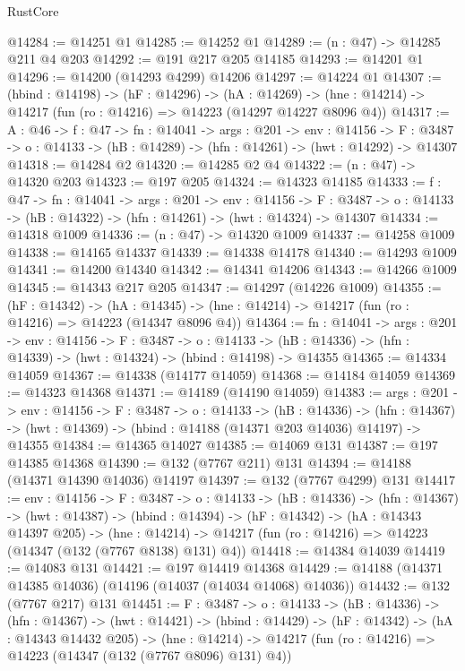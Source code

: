 \begin{lexlean}{RustCore}
\begin{coremodule}
@14284 := @14251 @1
@14285 := @14252 @1
@14289 := (n : @47) -> @14285 @211 @4 @203
@14292 := @191 @217 @205 @14185
@14293 := @14201 @1
@14296 := @14200 (@14293 @4299) @14206
@14297 := @14224 @1
@14307 := (hbind : @14198) ->
  (hF : @14296) ->
  (hA : @14269) -> (hne : @14214) -> @14217 (fun (ro : @14216) => @14223 (@14297 @14227 @8096 @4))
@14317 := {A : @46} ->
  {f : @47} ->
  {fn : @14041} ->
  {args : @201} ->
  {env : @14156} ->
  {F : @3487} -> {o : @14133} -> (hB : @14289) -> (hfn : @14261) -> (hwt : @14292) -> @14307
@14318 := @14284 @2
@14320 := @14285 @2 @4
@14322 := (n : @47) -> @14320 @203
@14323 := @197 @205
@14324 := @14323 @14185
@14333 := {f : @47} ->
  {fn : @14041} ->
  {args : @201} ->
  {env : @14156} ->
  {F : @3487} -> {o : @14133} -> (hB : @14322) -> (hfn : @14261) -> (hwt : @14324) -> @14307
@14334 := @14318 @1009
@14336 := (n : @47) -> @14320 @1009
@14337 := @14258 @1009
@14338 := @14165 @14337
@14339 := @14338 @14178
@14340 := @14293 @1009
@14341 := @14200 @14340
@14342 := @14341 @14206
@14343 := @14266 @1009
@14345 := @14343 @217 @205
@14347 := @14297 (@14226 @1009)
@14355 := (hF : @14342) ->
  (hA : @14345) -> (hne : @14214) -> @14217 (fun (ro : @14216) => @14223 (@14347 @8096 @4))
@14364 := {fn : @14041} ->
  {args : @201} ->
  {env : @14156} ->
  {F : @3487} ->
  {o : @14133} -> (hB : @14336) -> (hfn : @14339) -> (hwt : @14324) -> (hbind : @14198) -> @14355
@14365 := @14334 @14059
@14367 := @14338 (@14177 @14059)
@14368 := @14184 @14059
@14369 := @14323 @14368
@14371 := @14189 (@14190 @14059)
@14383 := {args : @201} ->
  {env : @14156} ->
  {F : @3487} ->
  {o : @14133} ->
  (hB : @14336) ->
  (hfn : @14367) -> (hwt : @14369) -> (hbind : @14188 (@14371 @203 @14036) @14197) -> @14355
@14384 := @14365 @14027
@14385 := @14069 @131
@14387 := @197 @14385 @14368
@14390 := @132 (@7767 @211) @131
@14394 := @14188 (@14371 @14390 @14036) @14197
@14397 := @132 (@7767 @4299) @131
@14417 := {env : @14156} ->
  {F : @3487} ->
  {o : @14133} ->
  (hB : @14336) ->
  (hfn : @14367) ->
  (hwt : @14387) ->
  (hbind : @14394) ->
  (hF : @14342) ->
  (hA : @14343 @14397 @205) ->
  (hne : @14214) -> @14217 (fun (ro : @14216) => @14223 (@14347 (@132 (@7767 @8138) @131) @4))
@14418 := @14384 @14039
@14419 := @14083 @131
@14421 := @197 @14419 @14368
@14429 := @14188 (@14371 @14385 @14036) (@14196 (@14037 (@14034 @14068) @14036))
@14432 := @132 (@7767 @217) @131
@14451 := {F : @3487} ->
  {o : @14133} ->
  (hB : @14336) ->
  (hfn : @14367) ->
  (hwt : @14421) ->
  (hbind : @14429) ->
  (hF : @14342) ->
  (hA : @14343 @14432 @205) ->
  (hne : @14214) -> @14217 (fun (ro : @14216) => @14223 (@14347 (@132 (@7767 @8096) @131) @4))

\end{coremodule}
\end{lexlean}
